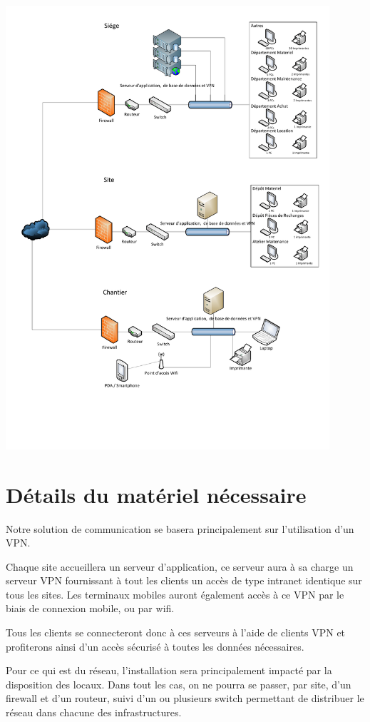 \includegraphics[width=0.9\textwidth]{img/schema-gstp.pdf}

\section{Détails du matériel nécessaire}

    Notre solution de communication se basera principalement sur l'utilisation d'un VPN.

    Chaque site accueillera un serveur d'application, ce serveur aura à sa charge un serveur VPN fournissant à tout les clients un accès de type intranet identique sur tous les sites.
    Les terminaux mobiles auront également accès à ce VPN par le biais de connexion mobile, ou par wifi.

    Tous les clients se connecteront donc à ces serveurs à l'aide de clients VPN et profiterons ainsi d'un accès sécurisé à toutes les données nécessaires.

    Pour ce qui est du réseau, l'installation sera principalement impacté par la disposition des locaux.
    Dans tout les cas, on ne pourra se passer, par site, d'un firewall et d'un routeur, suivi d'un ou plusieurs switch permettant de distribuer le réseau dans chacune des infrastructures.

